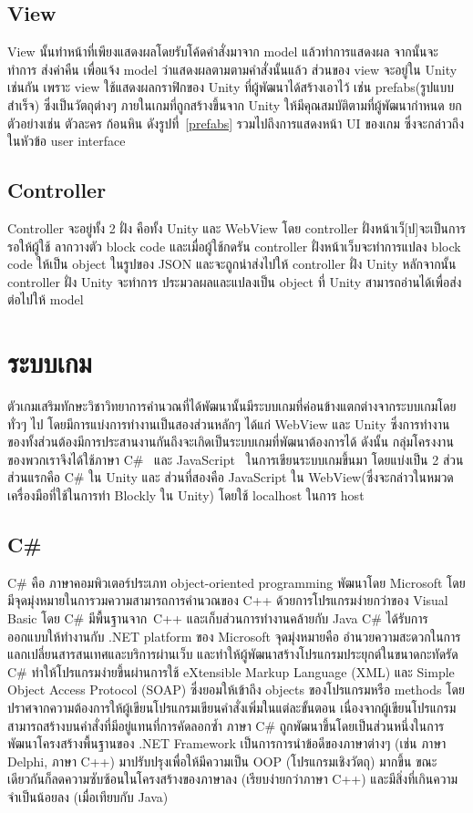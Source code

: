  \subsection{View}
 View นั้นทำหน้าที่เพียงแสดงผลโดยรับโค้ดคำสั่งมาจาก model แล้วทำการแสดงผล จากนั้นจะทำการ
 ส่งค่าคืน เพื่อแจ้ง model ว่าแสดงผลตามตามคำสั่งนั้นแล้ว ส่วนของ view จะอยู่ใน
 Unity เช่นกัน เพราะ view ใช้แสดงผลกราฟิกของ Unity ที่ผู้พัฒนาได้สร้างเอาไว้ เช่น prefabs(รูปแบบสำเร็จ) 
 ซึ่งเป็นวัตถุต่างๆ ภายในเกมที่ถูกสร้างขึ้นจาก Unity ให้มีคุณสมบัติตามที่ผู้พัฒนากำหนด ยกตัวอย่างเช่น ตัวละคร ก้อนหิน ดังรูปที่~\ref{prefabs}
 รวมไปถึงการแสดงหน้า UI ของเกม ซึ่งจะกล่าวถึงในหัวข้อ user interface
    

\subsection{Controller}
Controller จะอยู่ทั้ง 2 ฝั่ง คือทั้ง Unity และ WebView โดย controller ฝั่งหน้าเว็[ป]จะเป็นการรอให้ผู้ใช้
ลากวางตัว block code และเมื่อผู้ใช้กดรัน controller ฝั่งหน้าเว็บจะทำการแปลง block code ให้เป็น object 
ในรูปของ JSON และจะถูกนำส่งไปให้ controller ฝั่ง Unity หลักจากนั้น controller ฝั่ง Unity จะทำการ
ประมวลผลและแปลงเป็น object ที่ Unity สามารถอ่านได้เพื่อส่งต่อไปให้ model


\section{ระบบเกม}
ตัวเกมเสริมทักษะวิชาวิทยาการคำนวณที่ได้พัฒนานั้นมีระบบเกมที่ค่อนข้างแตกต่างจากระบบเกมโดยทั่วๆ ไป โดยมีการแบ่งการทำงานเป็นสองส่วนหลักๆ ได้แก่ WebView และ Unity
ซึ่งการทำงานของทั้งส่วนต้องมีการประสานงานกันถึงจะเกิดเป็นระบบเกมที่พัฒนาต้องการได้ ดังนั้น กลุ่มโครงงานของพวกเราจึงได้ใช้ภาษา C\#~\cite{cs} และ JavaScript~\cite{js}
ในการเขียนระบบเกมขึ้นมา โดยแบ่งเป็น 2 ส่วน ส่วนแรกคือ C\# ใน Unity 
และ ส่วนที่สองคือ JavaScript ใน WebView(ซึ่งจะกล่าวในหมวดเครื่องมือที่ใช้ในการทำ Blockly ใน Unity) โดยใช้ localhost ในการ host

\subsection{C\#}
C\# คือ ภาษาคอมพิวเตอร์ประเภท object-oriented programming พัฒนาโดย Microsoft โดยมีจุดมุ่งหมายในการวมความสามารถการคำนวณของ 
C++ ด้วยการโปรแกรมง่ายกว่าของ Visual Basic โดย C\# มีพื้นฐานจาก 
C++ และเก็บส่วนการทำงานคล้ายกับ Java 
C\# ได้รับการออกแบบให้ทำงานกับ .NET platform ของ Microsoft
จุดมุ่งหมายคือ อำนวยความสะดวกในการแลกเปลี่ยนสารสนเทศและบริการผ่านเว็บ 
และทำให้ผู้พัฒนาสร้างโปรแกรมประยุกต์ในขนาดกะทัดรัด C\# 
ทำให้โปรแกรมง่ายขึ้นผ่านการใช้ eXtensible Markup Language (XML) 
และ Simple Object Access Protocol (SOAP) 
ซึ่งยอมให้เข้าถึง objects ของโปรแกรมหรือ methods 
โดยปราศจากความต้องการให้ผู้เขียนโปรแกรมเขียนคำสั่งเพิ่มในแต่ละขั้นตอน 
เนื่องจากผู้เขียนโปรแกรมสามารถสร้างบนคำสั่งที่มีอยู่แทนที่การคัดลอกซ้ำ 
ภาษา C\# ถูกพัฒนาขึ้นโดยเป็นส่วนหนึ่งในการพัฒนาโครงสร้างพื้นฐานของ
.NET Framework เป็นการการนำข้อดีของภาษาต่างๆ 
(เช่น ภาษา Delphi, ภาษา C++) มาปรับปรุงเพื่อให้มีความเป็น OOP 
(โปรแกรมเชิงวัตถุ) มากขึ้น ขณะเดียวกันก็ลดความซับซ้อนในโครงสร้างของภาษาลง (เรียบง่ายกว่าภาษา C++) 
และมีสิ่งที่เกินความจำเป็นน้อยลง (เมื่อเทียบกับ Java)~\cite{cs}

